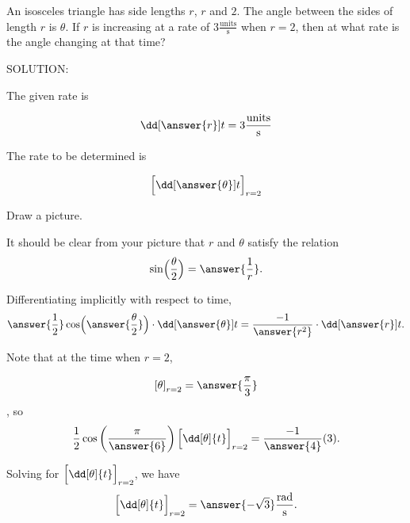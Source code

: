 \documentclass{ximera}
\author{Steven Gubkin\and Nela Lakos}
\begin{document}
\begin{exercise}

An isosceles triangle has side lengths $r$, $r$ and $2$.  The angle
between the sides of length $r$ is $\theta$.  If $r$ is increasing at
a rate of $3 \frac{\textrm{units}}{\textrm{s}}$ when $r = 2$, then at
what rate is the angle changing at that time?

SOLUTION:

The given rate is  

\[
 \dd[\answer{r}]{t}=3 \frac{\textrm{units}}{\textrm{s}}
\]

The rate to be determined is  

\[
\Bigl[ \dd[\answer{\theta}]{t}\Bigr]_{r=2}
\]


  Draw a picture.
\begin{hint}

  
  \begin{hint}
\begin{image}
\end{image}
\end{hint}

\end{hint}


  It should be clear from your picture that $r$ and $\theta$ satisfy the relation 
  \[
  \sin\Bigl(\frac{\theta}{2}\Bigr) = \answer{\frac{1}{r}}.
  \]



  Differentiating implicitly with respect to time, 
  \[
  \answer{\frac{1}{2}}\cos\Bigl(\answer{\frac{\theta}{2}}\Bigr) \cdot \dd[\answer{\theta}]{t} = \frac{-1}{\answer{r^2}}\cdot
  \dd[\answer{r}]{t}.
  \]



  Note that at the time when $r = 2$, 
  
  \[
 \left[ \theta \right]_{r=2}=\answer{ \frac{\pi}{3}}
  \]
  , so
  \[
  \frac{1}{2} \cos\left(\frac{\pi}{\answer{6}}\right)\Bigl[ \dd[\theta]{t}\Bigr]_{r=2} = \frac{-1}{\answer{4}} (3).
  \]



  Solving for $\Bigl[ \dd[\theta]{t}\Bigr]_{r=2} $, we have
  \[
\Bigl[ \dd[\theta]{t}\Bigr]_{r=2}  = \answer{-\sqrt{3}}\frac{\textrm{rad}}{\textrm{s}}.
  \]


\end{exercise}
\end{document}
